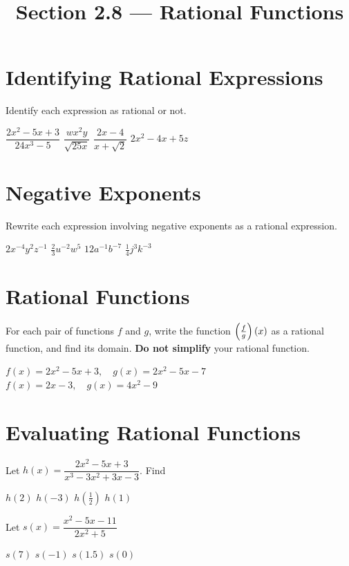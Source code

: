 

\title{Section 2.8 --- Rational Functions}


\maketitle
\section*{Identifying Rational Expressions}
Identify each expression as rational or not.
\begin{smenum}
\mitemxxxx
{$\dfrac{2x^2-5x+3}{24x^3-5}$}
{$\dfrac{wx^2y}{\sqrt{25x}}$}
{$\dfrac{2x-4}{x+\sqrt{2}}$}
{$2x^2-4x+5z$}
\end{smenum}

\section*{Negative Exponents}
Rewrite each expression involving negative exponents as a rational expression.
\begin{smenum}
\mitemxxxx
{$2x^{-4}y^2z^{-1}$}
{$\frac{2}{3}u^{-2}w^5$}
{$12a^{-1}b^{-7}$}
{$\frac{1}{4}j^{3}k^{-3}$}
\end{smenum}

\section*{Rational Functions}
For each pair of functions $f$ and $g$, write the function $\left(\frac{f}{g}\right)(x)$ as a rational function, and find its domain.  \textbf{Do not simplify} your rational function.
\begin{smenum}
\mitemxx
{$f(x)=2x^2-5x+3,\quad g(x)=2x^2-5x-7$}
{$f(x)=2x-3,\quad g(x)=4x^2-9$}
\end{smenum}

\section*{Evaluating Rational Functions}
Let $h(x)=\dfrac{2x^2-5x+3}{x^3-3x^2+3x-3}$.  Find
\begin{smenum}
\mitemxxxx
{$h(2)$}
{$h(-3)$}
{$h(\frac{1}{2})$}
{$h(1)$}
\end{smenum}
Let $s(x)=\dfrac{x^2-5x-11}{2x^2+5}$
\begin{smenum}
\mitemxxxx
{$s(7)$}
{$s(-1)$}
{$s(1.5)$}
{$s(0)$}
\end{smenum}

